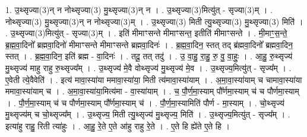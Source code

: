 \documentclass[17pt]{extarticle}
\begin{document}
1. उ॒थ्सृज्या(3)न् न नोथ्सृज्या(3) मु॒थ्सृज्या(3)न् न । . उ॒थ्सृज्या(3)मित्यु॑त् - सृज्या(3)म् । . नोथ्सृज्या(3) मु॒थ्सृज्या(3)न् न नोथ्सृज्या(3)म् । . उ॒थ्सृज्या(3) मिती त्यु॒थ्सृज्या(3) मु॒थ्सृज्या(3) मिति॑ । . उ॒थ्सृज्या(3)मित्यु॑त् - सृज्या(3)म् । . इति॑ मीमाꣳसन्ते मीमाꣳसन्त॒ इतीति॑ मीमाꣳसन्ते । . मी॒माꣳ॒॒स॒न्ते॒ ब्र॒ह्म॒वा॒दिनो᳚ ब्रह्मवा॒दिनो॑ मीमाꣳसन्ते मीमाꣳसन्ते ब्रह्मवा॒दिनः॑ । . ब्र॒ह्म॒वा॒दिन॒ स्तत् तद् ब्र॑ह्मवा॒दिनो᳚ ब्रह्मवा॒दिन॒ स्तत् । . ब्र॒ह्म॒वा॒दिन॒ इति॑ ब्रह्म - वा॒दिनः॑ । . तदू॒ तत् तदु॑ । . उ॒ वा॒हु॒ रा॒हु॒ रु॒ वु॒ वा॒हुः॒ । . आ॒हु॒ रु॒थ्सृज्य॑ मु॒थ्सृज्य॑ माहु राहु रु॒थ्सृज्य᳚म् । . उ॒थ्सृज्य॑ मे॒वै वोथ्सृज्य॑ मु॒थ्सृज्य॑ मे॒व । . उ॒थ्सृज्य॒मित्यु॑त् - सृज्य᳚म् । . ए॒वेती त्ये॒वैवेति॑ । . इत्य॑ मावा॒स्या॑या ममावा॒स्या॑या॒ मिती त्य॑मावा॒स्या॑याम् । . अ॒मा॒वा॒स्या॑याम् च चामावा॒स्या॑या ममावा॒स्या॑याम् च । . अ॒मा॒वा॒स्या॑या॒मित्य॑मा - वा॒स्या॑याम् । . च॒ पौ॒र्ण॒मा॒स्याम् पौ᳚र्णमा॒स्याम् च॑ च पौर्णमा॒स्याम् । . पौ॒र्ण॒मा॒स्याम् च॑ च पौर्णमा॒स्याम् पौ᳚र्णमा॒स्याम् च॑ । . पौ॒र्ण॒मा॒स्यामिति॑ पौर्ण - मा॒स्याम् । . चो॒थ्सृज्य॑ मु॒थ्सृज्य॑म् च चो॒थ्सृज्य᳚म् । . उ॒थ्सृज्य॒ मिती त्यु॒थ्सृज्य॑ मु॒थ्सृज्य॒ मिति॑ । . उ॒थ्सृज्य॒मित्यु॑त् - सृज्य᳚म् । . इत्या॑हु राहु॒ रिती त्या॑हुः । . आ॒हु॒ रे॒ते ए॒ते आ॑हु राहु रे॒ते । . ए॒ते हि ह्ये॑ते ए॒ते हि । \newline
\end{document}
